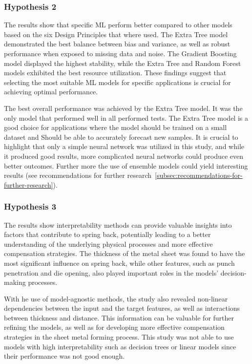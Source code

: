 \subsubsection{Hypothesis 2}

The results show that specific \ac{ML} perform better compared to other models based on the six Design Principles
that where used.
The Extra Tree model demonstrated the best balance between bias and variance, as well as robust performance when
exposed to missing data and noise.
The Gradient Boosting model displayed the highest stability, while the Extra Tree and Random Forest models exhibited
the best resource utilization.
These findings suggest that selecting the most suitable ML models for specific applications is crucial for achieving
optimal performance.

The best overall performance was achieved by the Extra Tree model.
It was the only model that performed well in all performed tests.
The Extra Tree model is a good choice for applications where the model should be trained on a small dataset and
Should be able to accurately forecast new samples.
It is crucial to highlight that only a simple neural network was utilized in this study, and while it produced good
results, more complicated neural networks could produce even better outcomes.
Further more the use of ensemble models could yield interesting results (see recommendations for further
research~\ref{subsec:recommendations-for-further-research}).

\subsubsection{Hypothesis 3}
The results show interpretability methods can provide valuable insights into factors that contribute to spring back,
potentially leading to a better understanding of the underlying physical processes and more effective compensation
strategies.
The thickness of the metal sheet was found to have the most significant influence on spring back, while other
features, such as punch penetration and die opening, also played important roles in the models' decision-making
processes.

With he use of model-agnostic methods, the study also revealed non-linear dependencies between the input and the
target features, as well as interactions between thickness and distance.
This information can be valuable for further refining the models, as well as for developing more effective
compensation strategies in the sheet metal forming process.
This study was not able to use models with high interpretability such as decision trees or linear models
since their performance was not good enough.

